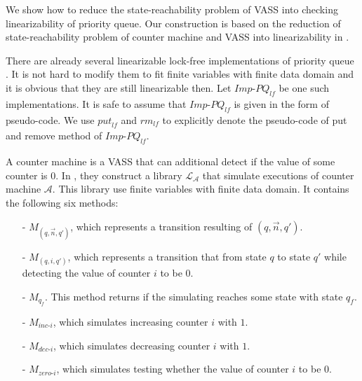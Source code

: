  We show how to reduce the state-reachability problem of VASS into checking linearizability of priority queue. Our construction is based on the reduction of state-reachability problem of counter machine and VASS into linearizability in \cite{conf/esop/BouajjaniEEH13}.

There are already several linearizable lock-free implementations of priority queue \cite{DBLP:conf/ipps/SundellT03,DBLP:conf/ppopp/LiuS12}. It is not hard to modify them to fit finite variables with finite data domain and it is obvious that they are still linearizable then. Let $\textit{Imp-PQ}_{\textit{lf}}$ be one such implementations. It is safe to assume that $\textit{Imp-PQ}_{\textit{lf}}$ is given in the form of pseudo-code. We use $\textit{put}_{\textit{lf}}$ and $\textit{rm}_{\textit{lf}}$ to explicitly denote the pseudo-code of put and remove method of $\textit{Imp-PQ}_{\textit{lf}}$.

A counter machine is a VASS that can additional detect if the value of some counter is $0$. In \cite{conf/esop/BouajjaniEEH13}, they construct a library $\mathcal{L}_{\mathcal{A}}$ that simulate executions of counter machine $\mathcal{A}$. This library use finite variables with finite data domain. It contains the following six methods:

\begin{itemize}
\setlength{\itemsep}{0.5pt}
\item[-] $M_{(q,\vec n,q')}$, which represents a transition resulting of $(q,\vec n,q')$.

\item[-] $M_{(q,i,q')}$, which represents a transition that from state $q$ to state $q'$ while detecting the value of counter $i$ to be $0$.

\item[-] $M_{q_f}$. This method returns if the simulating reaches some state with state $q_f$.

\item[-] $M_{\textit{inc-i}}$, which simulates increasing counter $i$ with $1$.

\item[-] $M_{\textit{dec-i}}$, which simulates decreasing counter $i$ with $1$.

\item[-] $M_{\textit{zero-i}}$, which simulates testing whether the value of counter $i$ to be $0$.
\end{itemize}

